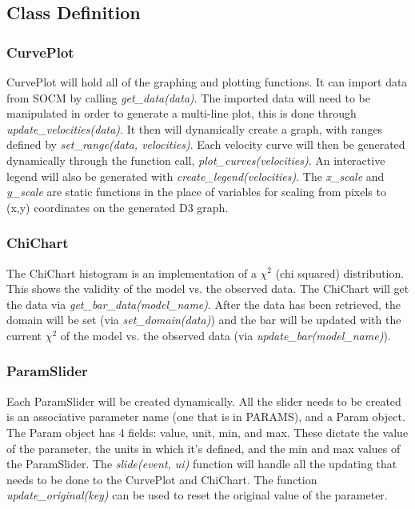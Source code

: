 \documentclass[titlepage]{article}
\begin{document}


\subsection{Class Definition}
\subsubsection{CurvePlot}
CurvePlot will hold all of the graphing and plotting functions. It can import data from SOCM by calling \textit{get\_data(data)}. The imported data will need to be manipulated in order to generate a multi-line plot, this is done through \textit{update\_velocities(data)}. It then will dynamically create a graph, with ranges defined by \textit{set\_range(data, velocities)}. Each velocity curve will then be generated dynamically through the function call, \textit{plot\_curves(velocities)}. An interactive legend will also be generated with \textit{create\_legend(velocities)}. The \textit{x\_scale} and \textit{y\_scale} are static functions in the place of variables for scaling from pixels to (x,y) coordinates on the generated D3 graph.

\subsubsection{ChiChart}
The ChiChart histogram is an implementation of a $\chi^2$ (chi squared) distribution. This shows the validity of the model vs. the observed data. The ChiChart will get the data via \textit{get\_bar\_data(model\_name)}. After the data has been retrieved, the domain will be set (via \textit{set\_domain(data)}) and the bar will be updated with the current $\chi^2$ of the model vs. the observed data (via \textit{update\_bar(model\_name)}).

\subsubsection{ParamSlider}
Each ParamSlider will be created dynamically. All the slider needs to be created is an associative parameter name (one that is in PARAMS), and a Param object. The Param object has 4 fields: value, unit, min, and max. These dictate the value of the parameter, the units in which it's defined, and the min and max values of the ParamSlider. The \textit{slide(event, ui)} function will handle all the updating that needs to be done to the CurvePlot and ChiChart. The function \textit{update\_original(key)} can be used to reset the original value of the parameter.
\end{document}
